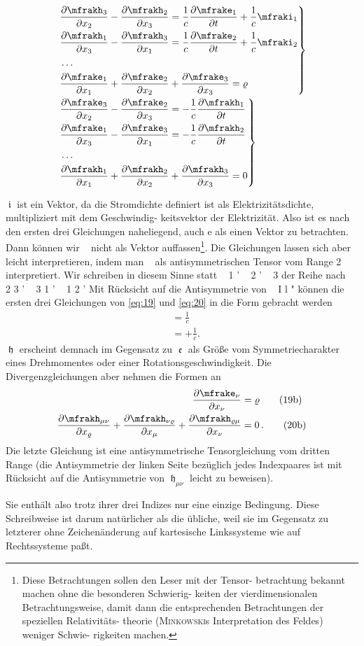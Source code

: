\begin{align}
&\left.
\begin{aligned}
&\frpa{\mfrakh_3}{x_2} - \frpa{\mfrakh_2}{x_3} =
\frac{1}{c} \frpa{\mfrake_1}{t} + \frac{1}{c} \mfraki_1
\\
&\frpa{\mfrakh_1}{x_3} - \frpa{\mfrakh_3}{x_1} =
\frac{1}{c} \frpa{\mfrake_2}{t} + \frac{1}{c} \mfraki_2
\\
&\ldots
\\
&\frpa{\mfrake_1}{x_1} + \frpa{\mfrake_2}{x_2} + \frpa{\mfrake_3}{x_3} = \varrho
\end{aligned}
\right\}
\label{eq:19} \\
&\left.
\begin{aligned}
&\frpa{\mfrake_3}{x_2} - \frpa{\mfrake_2}{x_3} =
-\frac{1}{c} \frpa{\mfrakh_1}{t}
\\
&\frpa{\mfrake_1}{x_3} - \frpa{\mfrake_3}{x_1} =
-\frac{1}{c} \frpa{\mfrakh_2}{t}
\\
&\ldots
\\
&\frpa{\mfrakh_1}{x_1} + \frpa{\mfrakh_2}{x_2} + \frpa{\mfrakh_3}{x_3} = 0
\end{aligned}
\right\}
\label{eq:20}
\end{align}


$\mfraki$ ist ein Vektor, da die Stromdichte definiert ist als
Elektrizitätsdichte, multipliziert mit dem Geschwindig-
keitsvektor der Elektrizität. Also ist es nach den ersten
drei Gleichungen naheliegend, auch e als einen Vektor
zu betrachten. Dann können wir
~
nicht als Vektor
auffassen\footnote{Diese Betrachtungen sollen den Leser mit der Tensor-
betrachtung bekannt machen ohne die besonderen Schwierig-
keiten der vierdimensionalen Betrachtungsweise, damit dann
die entsprechenden Betrachtungen der speziellen Relativitäts-
theorie (\textsc{Minkowski}s Interpretation des Feldes) weniger Schwie-
rigkeiten machen.}. Die Gleichungen lassen sich aber leicht
interpretieren, indem man
~
als antisymmetrischen
Tensor vom Range 2 interpretiert. Wir schreiben in
diesem Sinne statt ~ 1 ' ~ 2 ' ~ 3 der Reihe nach ~ 2 3 ' ~ 3 1 ' ~ 1 2 '
Mit Rücksicht auf die Antisymmetrie von ~ I l " können
die ersten drei Gleichungen von \eqref{eq:19} und \eqref{eq:20} in die
Form gebracht werden
\begin{align}
	&= \frac{1}{c}
	\tag{19a} \\
	&= +\frac{1}{c}.
	\tag{20a}
\end{align}
$\mfrakh$ erscheint demnach im Gegensatz zu $\mfrake$ als Größe vom 
Symmetriecharakter eines Drehmomentes oder einer Rotationsgeschwindigkeit. Die 
Divergenzgleichungen aber nehmen die Formen an
\begin{align}
	\frpa{\mfrake_{\nu}}{x_{\nu}}&= \varrho
	\tag{19b} \\
	\frpa{\mfrakh_{\mu\nu}}{x_{\varrho}} +
	\frpa{\mfrakh_{\nu\varrho}}{x_{\mu}} +
	\frpa{\mfrakh_{\varrho\mu}}{x_{\nu}} &= 0\,.
	\tag{20b}
\end{align}
Die letzte Gleichung ist eine antisymmetrische Tensorgleichung vom dritten Range 
(die Antisymmetrie der linken Seite bezüglich jedes Indexpaares ist mit 
Rücksicht auf die Antisymmetrie von $\mfrakh_{\mu\nu}$ leicht zu beweisen).

Sie enthält also trotz ihrer drei Indizes nur eine einzige Bedingung. Diese 
Schreibweise ist darum natürlicher als die übliche, weil sie im Gegensatz zu 
letzterer ohne Zeichenänderung auf kartesische Linkssysteme wie auf 
Rechtssysteme paßt.
